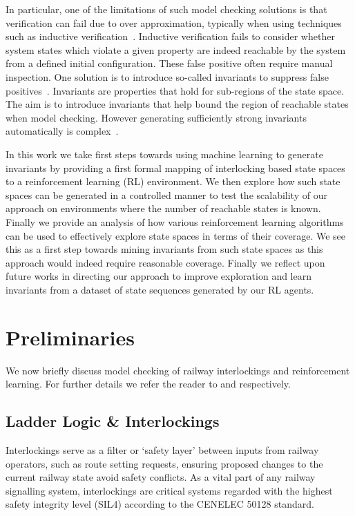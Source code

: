 \documentclass[conference,compsoc]{IEEEtran}
\begin{document}
In particular, one of the limitations of such model checking solutions is that verification can fail due to over approximation, typically when using techniques such as inductive verification~\cite{}. Inductive verification fails to consider whether system states which violate a given property are indeed reachable by the system from a defined initial configuration. These false positive  often require manual inspection. One solution is to introduce so-called invariants to suppress false positives~\cite{1688959}. Invariants are properties that hold for sub-regions of the state space. The aim is to introduce invariants that help bound the region of reachable states when model checking. However generating sufficiently strong invariants automatically is complex~\cite{}. 

In this work we take first steps towards using machine learning to generate invariants by providing a first formal mapping of interlocking based state spaces to a reinforcement learning (RL) environment. We then explore how such state spaces can be generated in a controlled manner to test the scalability of our approach on environments where the number of reachable states is known. Finally we provide an analysis of how various reinforcement learning algorithms can be used to effectively explore state spaces in terms of their coverage. We see this as a first step towards mining invariants from such state spaces as this approach would indeed require reasonable coverage. Finally we reflect upon future works in directing our approach to improve exploration and learn invariants from a dataset of state sequences generated by our RL agents. 


\section{Preliminaries}\label{sec:preliminaries}
We now briefly discuss  model checking of railway interlockings and reinforcement learning. For further details we refer the reader to \cite{kanso2009automated, james2013verification} and \cite{mnih2016asynchronous} respectively.

\subsection{Ladder Logic \& Interlockings}\label{sec:ladder_logic}
Interlockings serve as a filter or ‘safety layer’ between inputs from railway operators, such as route setting requests, ensuring proposed changes to the current railway state avoid safety conflicts. As a vital part of any railway signalling system, interlockings are critical systems regarded with the highest safety integrity level
(SIL4) according to the CENELEC 50128 standard. 
\end{document}

